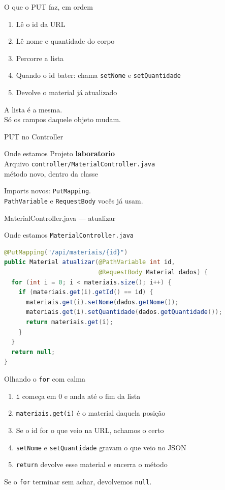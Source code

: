 \documentclass[aspectratio=169,11pt]{beamer}
\newcommand{\onde}[1]{%
  \begin{block}{Onde estamos}
    #1
  \end{block}
}
\begin{document}
\begin{frame}{O que o PUT faz, em ordem}
  \begin{enumerate}
    \item Lê o id da URL
    \item Lê nome e quantidade do corpo
    \item Percorre a lista
    \item Quando o id bater: chama \texttt{setNome} e
          \texttt{setQuantidade}
    \item Devolve o material já atualizado
  \end{enumerate}

  \vspace{0.5em}
  A lista é a mesma.\\
  Só os campos daquele objeto mudam.
\end{frame}

\begin{frame}[fragile]{PUT no Controller}
  \onde{Projeto \textbf{laboratorio}\\
        Arquivo \texttt{controller/MaterialController.java}\\
        método novo, dentro da classe}

  Imports novos: \texttt{PutMapping}.\\
  \texttt{PathVariable} e \texttt{RequestBody} vocês já usam.
\end{frame}

\begin{frame}[fragile]{MaterialController.java --- atualizar}
  \onde{\texttt{MaterialController.java}}

\begin{lstlisting}[language=Java,basicstyle=\ttfamily\footnotesize]
@PutMapping("/api/materiais/{id}")
public Material atualizar(@PathVariable int id,
                          @RequestBody Material dados) {
  for (int i = 0; i < materiais.size(); i++) {
    if (materiais.get(i).getId() == id) {
      materiais.get(i).setNome(dados.getNome());
      materiais.get(i).setQuantidade(dados.getQuantidade());
      return materiais.get(i);
    }
  }
  return null;
}
\end{lstlisting}
\end{frame}

\begin{frame}{Olhando o \texttt{for} com calma}
  \begin{enumerate}
    \item \texttt{i} começa em 0 e anda até o fim da lista
    \item \texttt{materiais.get(i)} é o material daquela posição
    \item Se o id for o que veio na URL, achamos o certo
    \item \texttt{setNome} e \texttt{setQuantidade} gravam
          o que veio no JSON
    \item \texttt{return} devolve esse material e encerra o método
  \end{enumerate}

  \vspace{0.5em}
  Se o \texttt{for} terminar sem achar, devolvemos \texttt{null}.
\end{frame}
\end{document}
